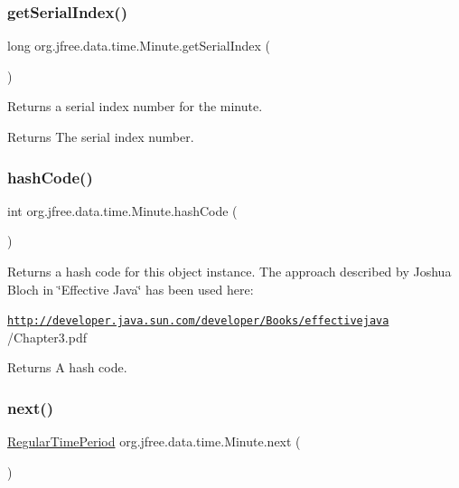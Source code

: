\subsubsection{\texorpdfstring{get\+Serial\+Index()}{getSerialIndex()}}
{\footnotesize\ttfamily long org.\+jfree.\+data.\+time.\+Minute.\+get\+Serial\+Index (\begin{DoxyParamCaption}{ }\end{DoxyParamCaption})}

Returns a serial index number for the minute.

\begin{DoxyReturn}{Returns}
The serial index number. 
\end{DoxyReturn}
\mbox{\label{classorg_1_1jfree_1_1data_1_1time_1_1_minute_a6365f935f1dddbd458249bfa08ff02f3}} 
\subsubsection{\texorpdfstring{hash\+Code()}{hashCode()}}
{\footnotesize\ttfamily int org.\+jfree.\+data.\+time.\+Minute.\+hash\+Code (\begin{DoxyParamCaption}{ }\end{DoxyParamCaption})}

Returns a hash code for this object instance. The approach described by Joshua Bloch in \char`\"{}\+Effective Java\char`\"{} has been used here\+: 

{\ttfamily \href{http://developer.java.sun.com/developer/Books/effectivejava}{\tt http\+://developer.\+java.\+sun.\+com/developer/\+Books/effectivejava} /\+Chapter3.pdf}

\begin{DoxyReturn}{Returns}
A hash code. 
\end{DoxyReturn}
\mbox{\label{classorg_1_1jfree_1_1data_1_1time_1_1_minute_a6213ef85da8a4184b72edfe5d26a9e39}} 
\subsubsection{\texorpdfstring{next()}{next()}}
{\footnotesize\ttfamily \mbox{\hyperlink{classorg_1_1jfree_1_1data_1_1time_1_1_regular_time_period}{Regular\+Time\+Period}} org.\+jfree.\+data.\+time.\+Minute.\+next (\begin{DoxyParamCaption}{ }\end{DoxyParamCaption})}

